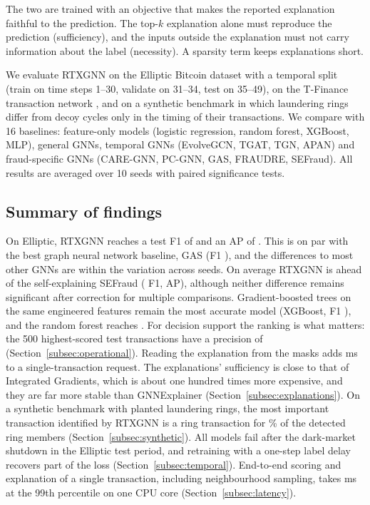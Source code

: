 The two are trained with an objective that makes the reported explanation faithful to the prediction. The top-$k$ explanation alone must reproduce the prediction (sufficiency), and the inputs outside the explanation must not carry information about the label (necessity). A sparsity term keeps explanations short.

We evaluate RTXGNN on the Elliptic Bitcoin dataset \citep{weber2019anti} with a temporal split (train on time steps 1--30, validate on 31--34, test on 35--49), on the T-Finance transaction network \citep{tang2022rethinking}, and on a synthetic benchmark in which laundering rings differ from decoy cycles only in the timing of their transactions. We compare with 16 baselines: feature-only models (logistic regression, random forest, XGBoost, MLP), general GNNs, temporal GNNs (EvolveGCN, TGAT, TGN, APAN) and fraud-specific GNNs (CARE-GNN, PC-GNN, GAS, FRAUDRE, SEFraud). All results are averaged over 10 seeds with paired significance tests.

\subsection*{Summary of findings}

On Elliptic, RTXGNN reaches a test F1 of \rtxFone{} and an AP of \rtxAP{}. This is on par with the best graph neural network baseline, GAS (F1 \gasFone), and the differences to most other GNNs are within the variation across seeds. On average RTXGNN is ahead of the self-explaining SEFraud (\deltaFOnesefraud{} F1, \deltaAPsefraud{} AP), although neither difference remains significant after correction for multiple comparisons. Gradient-boosted trees on the same engineered features remain the most accurate model (XGBoost, F1 \xgbFone), and the random forest reaches \rfFone. For decision support the ranking is what matters: the 500 highest-scored test transactions have a precision of \rtxPrecAtFive{} (Section~\ref{subsec:operational}). Reading the explanation from the masks adds \rtxLatBoneExp{} ms to a single-transaction request. The explanations' sufficiency is close to that of Integrated Gradients, which is about one hundred times more expensive, and they are far more stable than GNNExplainer (Section~\ref{subsec:explanations}). On a synthetic benchmark with planted laundering rings, the most important transaction identified by RTXGNN is a ring transaction for \ringHitPct\% of the detected ring members (Section~\ref{subsec:synthetic}). All models fail after the dark-market shutdown in the Elliptic test period, and retraining with a one-step label delay recovers part of the loss (Section~\ref{subsec:temporal}). End-to-end scoring and explanation of a single transaction, including neighbourhood sampling, takes \rtxLatBoneP{} ms at the 99th percentile on one CPU core (Section~\ref{subsec:latency}).


